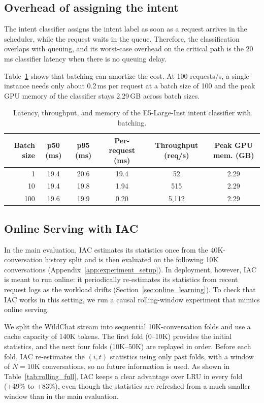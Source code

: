 \documentclass{article}
\begin{document}
\subsection{Overhead of assigning the intent}
\label{app:overhead}

The intent classifier assigns the intent label as soon as a request arrives in the scheduler, while the request waits in the queue. Therefore, the classification overlaps with queuing, and its worst-case overhead on the critical path is the 20\,ms classifier latency when there is no queuing delay.

Table~\ref{tab:batching} shows that batching can amortize the cost. At 100 requests/s, a single instance needs only about 0.2\,ms per request at a batch size of 100 and the peak GPU memory of the classifier stays 2.29\,GB across batch sizes.

\begin{table}[h]
\centering
\caption{ Latency, throughput, and memory of the E5-Large-Inst intent classifier with batching.}
\label{tab:batching}
\small
 \begin{tabular}{rccccc}
\toprule
Batch size & p50 (ms) & p95 (ms) & Per-request (ms) & Throughput (req/s) & Peak GPU mem. (GB) \\
\midrule
1     & 19.4 & 20.6 & 19.4  & 52     & 2.29 \\
10    & 19.4 & 19.8 & 1.94  & 515    & 2.29 \\
100   & 19.6 & 19.9 & 0.20  & 5,112  & 2.29 \\
\bottomrule
\end{tabular}
\end{table}



\subsection{Online Serving with IAC}
\label{app:online_serving}

In the main evaluation, IAC estimates its statistics once from the 40K-conversation history split and is then evaluated on the following 10K conversations (Appendix~\ref{app:experiment_setup}). In deployment, however, IAC is meant to run online: it periodically re-estimates its statistics from recent request logs as the workload drifts (Section~\ref{sec:online_learning}). To check that IAC works in this setting, we run a causal rolling-window experiment that mimics online serving.

We split the WildChat stream into sequential 10K-conversation folds and use a cache capacity of 140K tokens. The first fold (0--10K) provides the initial statistics, and the next four folds (10K--50K) are replayed in order. Before each fold, IAC re-estimates the \((i,t)\) statistics using only past folds, with a window of \(N=10\)K conversations, so no future information is used. As shown in Table~\ref{tab:rolling_full}, IAC keeps a clear advantage over LRU in every fold (+49\% to +83\%), even though the statistics are refreshed from a much smaller window than in the main evaluation.
\end{document}
